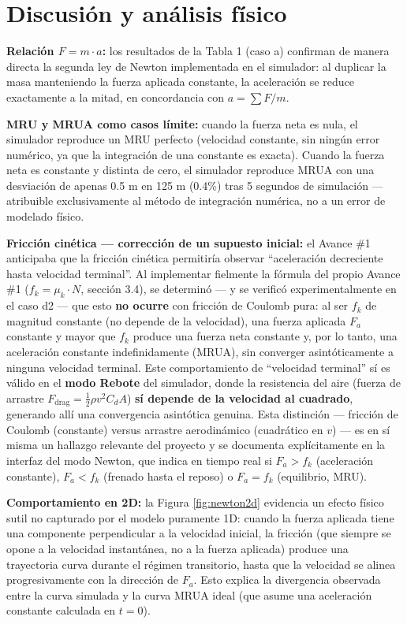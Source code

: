 \documentclass[12pt,letterpaper]{article}
\begin{document}
\section{Discusión y análisis físico}
\label{sec:discusion}

\textbf{Relación $F = m\cdot a$:} los resultados de la Tabla 1 (caso a) confirman de manera directa la segunda ley de Newton implementada en el simulador: al duplicar la masa manteniendo la fuerza aplicada constante, la aceleración se reduce exactamente a la mitad, en concordancia con $a = \sum F / m$.

\textbf{MRU y MRUA como casos límite:} cuando la fuerza neta es nula, el simulador reproduce un MRU perfecto (velocidad constante, sin ningún error numérico, ya que la integración de una constante es exacta). Cuando la fuerza neta es constante y distinta de cero, el simulador reproduce MRUA con una desviación de apenas 0.5 m en 125 m (0.4\%) tras 5 segundos de simulación --- atribuible exclusivamente al método de integración numérica, no a un error de modelado físico.

\textbf{Fricción cinética --- corrección de un supuesto inicial:} el Avance \#1 anticipaba que la fricción cinética permitiría observar ``aceleración decreciente hasta velocidad terminal''. Al implementar fielmente la fórmula del propio Avance \#1 ($f_k = \mu_k \cdot N$, sección 3.4), se determinó --- y se verificó experimentalmente en el caso d2 --- que esto \textbf{no ocurre} con fricción de Coulomb pura: al ser $f_k$ de magnitud constante (no depende de la velocidad), una fuerza aplicada $F_a$ constante y mayor que $f_k$ produce una fuerza neta constante y, por lo tanto, una aceleración constante indefinidamente (MRUA), sin converger asintóticamente a ninguna velocidad terminal. Este comportamiento de ``velocidad terminal'' sí es válido en el \textbf{modo Rebote} del simulador, donde la resistencia del aire (fuerza de arrastre $F_{\text{drag}} = \tfrac{1}{2}\rho v^2 C_d A$) \textbf{sí depende de la velocidad al cuadrado}, generando allí una convergencia asintótica genuina. Esta distinción --- fricción de Coulomb (constante) versus arrastre aerodinámico (cuadrático en $v$) --- es en sí misma un hallazgo relevante del proyecto y se documenta explícitamente en la interfaz del modo Newton, que indica en tiempo real si $F_a>f_k$ (aceleración constante), $F_a<f_k$ (frenado hasta el reposo) o $F_a=f_k$ (equilibrio, MRU).

\textbf{Comportamiento en 2D:} la Figura \ref{fig:newton2d} evidencia un efecto físico sutil no capturado por el modelo puramente 1D: cuando la fuerza aplicada tiene una componente perpendicular a la velocidad inicial, la fricción (que siempre se opone a la velocidad instantánea, no a la fuerza aplicada) produce una trayectoria curva durante el régimen transitorio, hasta que la velocidad se alinea progresivamente con la dirección de $F_a$. Esto explica la divergencia observada entre la curva simulada y la curva MRUA ideal (que asume una aceleración constante calculada en $t=0$).
\end{document}
